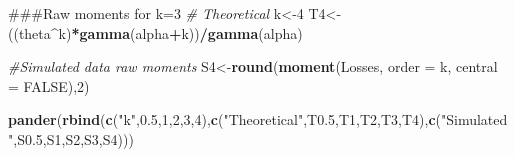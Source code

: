 \documentclass[]{book}
\newenvironment{Shaded}{\begin{snugshade}}{\end{snugshade}}
\newcommand{\KeywordTok}[1]{\textcolor[rgb]{0.13,0.29,0.53}{\textbf{#1}}}
\newcommand{\DataTypeTok}[1]{\textcolor[rgb]{0.13,0.29,0.53}{#1}}
\newcommand{\DecValTok}[1]{\textcolor[rgb]{0.00,0.00,0.81}{#1}}
\newcommand{\FloatTok}[1]{\textcolor[rgb]{0.00,0.00,0.81}{#1}}
\newcommand{\StringTok}[1]{\textcolor[rgb]{0.31,0.60,0.02}{#1}}
\newcommand{\CommentTok}[1]{\textcolor[rgb]{0.56,0.35,0.01}{\textit{#1}}}
\newcommand{\OtherTok}[1]{\textcolor[rgb]{0.56,0.35,0.01}{#1}}
\newcommand{\OperatorTok}[1]{\textcolor[rgb]{0.81,0.36,0.00}{\textbf{#1}}}
\newcommand{\NormalTok}[1]{#1}
\theoremstyle{definition}
\theoremstyle{definition}
\theoremstyle{definition}
\theoremstyle{remark}
\begin{document}
\begin{Shaded}
\begin{Highlighting}[]
\NormalTok{###Raw moments for k=3}
\CommentTok{# Theoretical }
\NormalTok{k<-}\DecValTok{4}
\NormalTok{T4<-((theta}\OperatorTok{^}\NormalTok{k)}\OperatorTok{*}\KeywordTok{gamma}\NormalTok{(alpha}\OperatorTok{+}\NormalTok{k))}\OperatorTok{/}\KeywordTok{gamma}\NormalTok{(alpha)}

\CommentTok{#Simulated data raw moments}
\NormalTok{S4<-}\KeywordTok{round}\NormalTok{(}\KeywordTok{moment}\NormalTok{(Losses, }\DataTypeTok{order =}\NormalTok{ k, }\DataTypeTok{central =} \OtherTok{FALSE}\NormalTok{),}\DecValTok{2}\NormalTok{)}

\KeywordTok{pander}\NormalTok{(}\KeywordTok{rbind}\NormalTok{(}\KeywordTok{c}\NormalTok{(}\StringTok{"k"}\NormalTok{,}\FloatTok{0.5}\NormalTok{,}\DecValTok{1}\NormalTok{,}\DecValTok{2}\NormalTok{,}\DecValTok{3}\NormalTok{,}\DecValTok{4}\NormalTok{),}\KeywordTok{c}\NormalTok{(}\StringTok{"Theoretical"}\NormalTok{,T0.}\DecValTok{5}\NormalTok{,T1,T2,T3,T4),}\KeywordTok{c}\NormalTok{(}\StringTok{"Simulated"}\NormalTok{,S0.}\DecValTok{5}\NormalTok{,S1,S2,S3,S4)))}
\end{Highlighting}
\end{Shaded}
\end{document}
